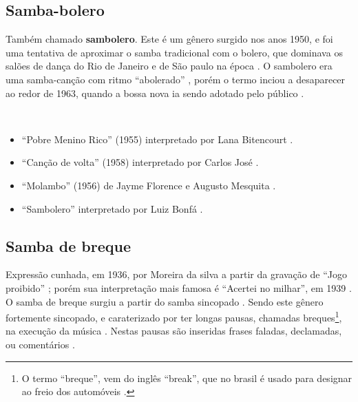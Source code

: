 \subsection{Samba-bolero}
Também chamado \textbf{sambolero}.
Este é um gênero surgido nos anos 1950, e foi uma tentativa de aproximar o samba tradicional com o bolero,
que dominava os salões de dança do Rio de Janeiro e de São paulo na época \cite[pp. 291]{dourado2004dicionario}.
O sambolero era uma samba-canção com ritmo ``abolerado'' \cite[pp. 685]{marcondes1977enciclopediav2},
porém o termo inciou a desaparecer ao redor de 1963, 
quando a bossa nova ia sendo adotado pelo público \cite[pp. 84]{biblioteca2006cultura}.

\begin{example} ~

\begin{itemize}
\item ``Pobre Menino Rico'' (1955) interpretado  por Lana Bitencourt \cite[pp. 5]{pobremeninorico}.
\item ``Canção de volta'' (1958) interpretado por Carlos José \cite[pp. 36]{carlosjose}.
\item ``Molambo'' (1956) de Jayme Florence e Augusto Mesquita \cite[pp. 481, 516]{faour2001bastidores}.
\item ``Sambolero'' interpretado por Luiz Bonfá \cite[pp. 49]{sambolero}.
\end{itemize}
\end{example}


\subsection{Samba de breque} 

Expressão cunhada, em 1936, por Moreira da silva a partir da gravação de ``Jogo proibido'' \cite[pp. 291]{dourado2004dicionario};
porém sua interpretação mais famosa é ``Acertei no milhar'', em 1939 \cite[pp. 129]{perna2002samba}.
O samba de breque surgiu a partir do samba sincopado \cite[pp. 129]{perna2002samba}.
Sendo este gênero fortemente sincopado, 
e caraterizado por ter longas pausas, chamadas breques\footnote{
O termo ``breque'', vem do inglês ``break'', 
que no brasil é usado para designar ao freio dos automóveis \cite[pp. 684]{marcondes1977enciclopediav2}.}, 
na execução da música \cite[pp. 291]{dourado2004dicionario}.
Nestas pausas são inseridas frases faladas, declamadas, ou comentários \cite[pp. 129]{perna2002samba} \cite[pp. 291]{dourado2004dicionario}. 


